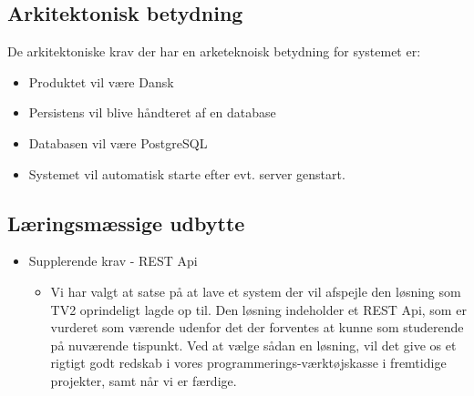 \subsection{Arkitektonisk betydning}
De arkitektoniske krav der har en arketeknoisk betydning for systemet er:
\begin{itemize}
    \item Produktet vil være Dansk
    \item Persistens vil blive håndteret af en database
    \item Databasen vil være PostgreSQL
    \item Systemet vil automatisk starte efter evt. server genstart.
    
\end{itemize}



\subsection{Læringsmæssige udbytte}
\begin{itemize}
    \item Supplerende krav - REST Api
    \begin{itemize}
        \item Vi har valgt at satse på at lave et system der vil afspejle den løsning som TV2 oprindeligt lagde op til. Den løsning indeholder et REST Api, som er vurderet som værende udenfor det der forventes at kunne som studerende på nuværende tispunkt. Ved at vælge sådan en løsning, vil det give os et rigtigt godt redskab i vores programmerings-værktøjskasse i fremtidige projekter, samt når vi er færdige.
    \end{itemize}{}
\end{itemize}


